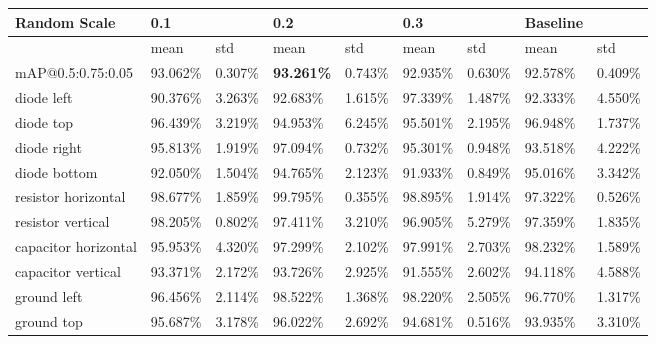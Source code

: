 
\begin{table}[H]
\scriptsize %
\begin{center}
\begin{tabular}{|l|l|l|l|l|l|l|l|l|}
\hline
Random Scale                    & 0.1      &          & 0.2      &          & 0.3      &          & Baseline &              \\
\hline
                                & mean     & std      & mean     & std      & mean     & std      & mean     & std          \\
\hline
mAP@0.5:0.75:0.05               & 93.062\% & 0.307\% & \textbf{93.261\%} & 0.743\% & 92.935\%   & 0.630\%   & 92.578\%  & 0.409\%   \\
\hline
\rowcolor{lightgray!50}
diode left                      & 90.376\% & 3.263\% & 92.683\% & 1.615\% & 97.339\%   & 1.487\%   & 92.333\%  & 4.550\%   \\
diode top                       & 96.439\% & 3.219\% & 94.953\% & 6.245\% & 95.501\%   & 2.195\%   & 96.948\%  & 1.737\%   \\
\rowcolor{lightgray!50}
diode right                     & 95.813\% & 1.919\% & 97.094\% & 0.732\% & 95.301\%   & 0.948\%   & 93.518\%  & 4.222\%   \\
diode bottom                    & 92.050\% & 1.504\% & 94.765\% & 2.123\% & 91.933\%   & 0.849\%   & 95.016\%  & 3.342\%   \\
\rowcolor{lightgray!50}
resistor horizontal             & 98.677\% & 1.859\% & 99.795\% & 0.355\% & 98.895\%   & 1.914\%   & 97.322\%  & 0.526\%   \\
resistor vertical               & 98.205\% & 0.802\% & 97.411\% & 3.210\% & 96.905\%   & 5.279\%   & 97.359\%  & 1.835\%   \\
\rowcolor{lightgray!50}
capacitor horizontal            & 95.953\% & 4.320\% & 97.299\% & 2.102\% & 97.991\%   & 2.703\%   & 98.232\%  & 1.589\%   \\
capacitor vertical              & 93.371\% & 2.172\% & 93.726\% & 2.925\% & 91.555\%   & 2.602\%   & 94.118\%  & 4.588\%   \\
\rowcolor{lightgray!50}
ground left                     & 96.456\% & 2.114\% & 98.522\% & 1.368\% & 98.220\%   & 2.505\%   & 96.770\%  & 1.317\%   \\
ground top                      & 95.687\% & 3.178\% & 96.022\% & 2.692\% & 94.681\%   & 0.516\%   & 93.935\%  & 3.310\%   \\

\end{tabular}
\end{center}
\end{table}
